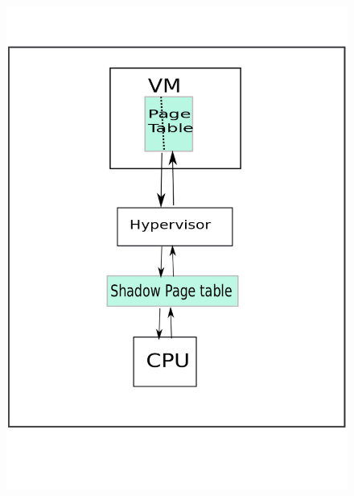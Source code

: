 \documentclass[seminar,twoside]{iitbreport}
\begin{document}
\begin{figure}
\label{fig-circles}
\centering
\includegraphics[scale =0.2]{shadow.png}

\end{figure}
\end{document}
